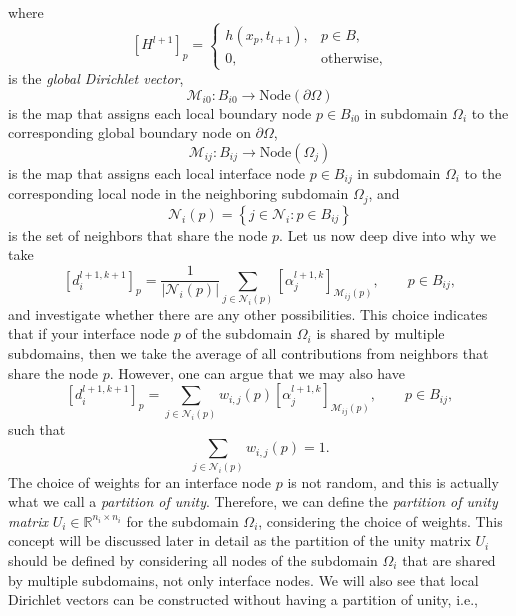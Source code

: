 \documentclass[a4paper, 11pt]{article}
\theoremstyle{plain}
\theoremstyle{definition}
\theoremstyle{remark}
\begin{document}
where 
\begin{equation*}
    \left[H^{l+1}\right]_{p} = 
    \begin{cases}
        h(x_{p}, t_{l+1}), & p\in B,\\
        0, & \text{otherwise},
    \end{cases}
\end{equation*}
is the \textit{global Dirichlet vector},
\begin{equation*}
    \mathcal{M}_{i0} : B_{i0} \to \text{Node}(\partial\Omega)
\end{equation*}
is the map that assigns each local boundary node $p \in B_{i0}$ in subdomain $\Omega_i$ to the corresponding global boundary node on $\partial\Omega$,
\begin{equation*}
    \mathcal{M}_{ij} : B_{ij} \to \text{Node}(\Omega_{j})
\end{equation*}
is the map that assigns each local interface node $p \in B_{ij}$ in subdomain $\Omega_i$ to the corresponding local node in the neighboring subdomain $\Omega_j$, and
\begin{equation*}
    \mathcal{N}_{i}(p) = \left\{j \in \mathcal{N}_{i}: p\in B_{ij}\right\}
\end{equation*}
is the set of neighbors that share the node $p$. Let us now deep dive into why we take 
\begin{equation*}
    \left[d^{l+1, k+1}_{i}\right]_{p} = \dfrac{1}{\lvert \mathcal{N}_{i}(p)\rvert}\sum\limits_{j\in\mathcal{N}_{i}(p)}\left[\alpha^{l+1, k}_{j}\right]_{\mathcal{M}_{ij}(p)}, \qquad p\in B_{ij},
\end{equation*}
and investigate whether there are any other possibilities. This choice indicates that if your interface node $p$ of the subdomain $\Omega_{i}$ is shared by multiple subdomains, then we take the average of all contributions from neighbors that share the node $p$. However, one can argue that we may also have
\begin{equation*}
    \left[d^{l+1, k+1}_{i}\right]_{p} = \sum\limits_{j\in\mathcal{N}_{i}(p)} w_{i, j}(p)\left[\alpha^{l+1, k}_{j}\right]_{\mathcal{M}_{ij}(p)}, \qquad p\in B_{ij},
\end{equation*}
such that
\begin{equation*}
    \sum_{j\in\mathcal{N}_{i}(p)}w_{i, j}(p) = 1.
\end{equation*}
The choice of weights for an interface node $p$ is not random, and this is actually what we call a \textit{partition of unity}. Therefore, we can define the \textit{partition of unity matrix} $U_{i}\in \mathbb{R}^{n_{i}\times n_{i}}$ for the subdomain $\Omega_{i}$, considering the choice of weights. This concept will be discussed later in detail as the partition of the unity matrix $U_{i}$ should be defined by considering all nodes of the subdomain $\Omega_{i}$ that are shared by multiple subdomains, not only interface nodes. We will also see that local Dirichlet vectors can be constructed without having a partition of unity, i.e.,
\end{document}
